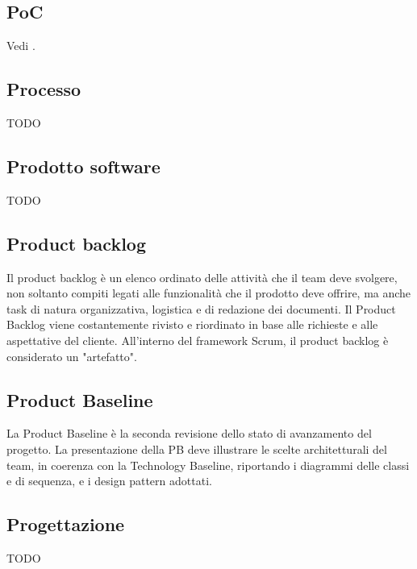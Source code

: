 \subsection*{PoC}
\par Vedi .

\vspace{2em}
\subsection*{Processo}
TODO

\vspace{2em}
\subsection*{Prodotto software}
TODO

\vspace{2em}
\subsection*{Product backlog}
Il product backlog è un elenco ordinato delle attività che il team deve svolgere, non soltanto compiti legati alle funzionalità che il prodotto deve offrire, ma anche task di natura organizzativa, logistica e di redazione dei documenti. Il Product Backlog viene costantemente rivisto e riordinato in base alle richieste e alle aspettative del cliente. All’interno del framework Scrum, il product backlog è considerato un "artefatto".

\vspace{2em}
\subsection*{Product Baseline}
La Product Baseline è la seconda revisione dello stato di avanzamento del progetto. La presentazione della PB deve illustrare le scelte architetturali del team, in coerenza con la Technology Baseline, riportando i diagrammi delle classi e di sequenza, e i design pattern adottati.

\vspace{2em}
\subsection*{Progettazione}
TODO

\vspace{2em}
